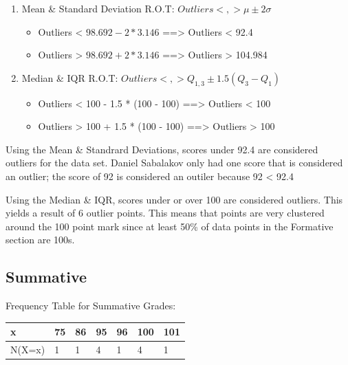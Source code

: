 \documentclass[letterpaper]{article}
\def\tightlist{}
\begin{document}
\begin{enumerate}
\def\labelenumi{\arabic{enumi}.}
\tightlist
\item
  Mean \& Standard Deviation R.O.T: \(Outliers <,> \mu \pm 2\sigma\)

  \begin{itemize}
  \tightlist
  \item
    Outliers \textless{} \(98.692 - 2*3.146\) ==\textgreater{} Outliers \textless{} 92.4
  \item
    Outliers \textgreater{} \(98.692 + 2*3.146\) ==\textgreater{} Outliers \textgreater{} 104.984
  \end{itemize}
\item
  Median \& IQR R.O.T: \(Outliers <,> Q_{1,3} \pm 1.5(Q_3-Q_1)\)

  \begin{itemize}
  \tightlist
  \item
    Outliers \textless{} 100 - 1.5 * (100 - 100) ==\textgreater{} Outliers \textless{} 100
  \item
    Outliers \textgreater{} 100 + 1.5 * (100 - 100) ==\textgreater{} Outliers \textgreater{} 100
  \end{itemize}
\end{enumerate}

Using the Mean \& Standrard Deviations, scores under 92.4 are considered outliers for the data set. Daniel Sabalakov only had one score that is considered an outlier; the score of 92 is considered an outiler because 92 \textless{} 92.4

Using the Median \& IQR, scores under or over 100 are considered outliers. This yields a result of 6 outlier points. This means that points are very clustered around the 100 point mark since at least 50\% of data points in the Formative section are 100\textquotesingle s.

\subsection*{Summative}\label{summative}

Frequency Table for Summative Grades:

\begin{longtable}[]{@{}lllllll@{}}
\toprule\noalign{}
x & 75 & 86 & 95 & 96 & 100 & 101 \\
\midrule\noalign{}
\endhead
\bottomrule\noalign{}
\endlastfoot
N(X=x) & 1 & 1 & 4 & 1 & 4 & 1 \\
\end{longtable}
\end{document}
